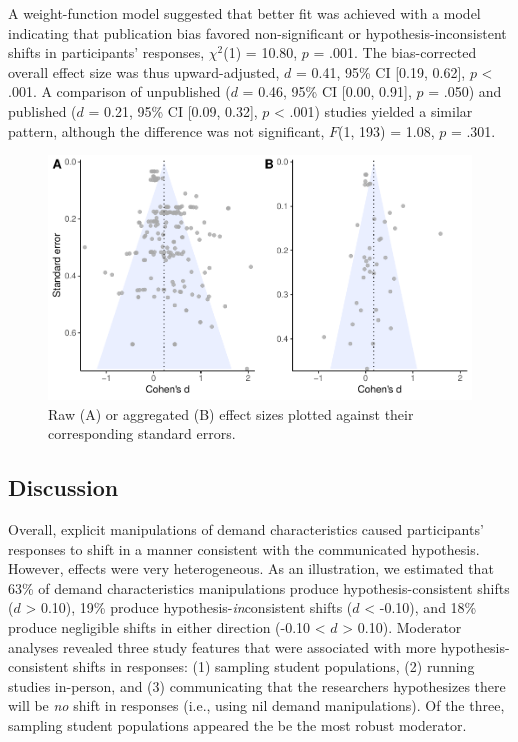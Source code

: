 \documentclass[
  man,floatsintext]{apa6}
\begin{document}
A weight-function model suggested that better fit was achieved with a model indicating that publication bias favored non-significant or hypothesis-inconsistent shifts in participants' responses, \(\chi^2\)(1) = 10.80, \(p\) = .001. The bias-corrected overall effect size was thus upward-adjusted, \(d\) = 0.41, 95\% CI {[}0.19, 0.62{]}, \(p\) \textless{} .001. A comparison of unpublished (\(d\) = 0.46, 95\% CI {[}0.00, 0.91{]}, \(p\) = .050) and published (\(d\) = 0.21, 95\% CI {[}0.09, 0.32{]}, \(p\) \textless{} .001) studies yielded a similar pattern, although the difference was not significant, \(F\)(1, 193) = 1.08, \(p\) = .301.

\begin{figure}
\centering
\includegraphics{metaware_manuscript_files/figure-latex/funnel-1.pdf}
\caption{\label{fig:funnel}Raw (A) or aggregated (B) effect sizes plotted against their corresponding standard errors.}
\end{figure}

\hypertarget{discussion}{%
\subsection{Discussion}\label{discussion}}

Overall, explicit manipulations of demand characteristics caused participants' responses to shift in a manner consistent with the communicated hypothesis. However, effects were very heterogeneous. As an illustration, we estimated that 63\% of demand characteristics manipulations produce hypothesis-consistent shifts (\(d\) \textgreater{} 0.10), 19\% produce hypothesis-\emph{in}consistent shifts (\(d\) \textless{} -0.10), and 18\% produce negligible shifts in either direction (-0.10 \textless{} \(d\) \textgreater{} 0.10). Moderator analyses revealed three study features that were associated with more hypothesis-consistent shifts in responses: (1) sampling student populations, (2) running studies in-person, and (3) communicating that the researchers hypothesizes there will be \emph{no} shift in responses (i.e., using nil demand manipulations). Of the three, sampling student populations appeared the be the most robust moderator.
\end{document}
